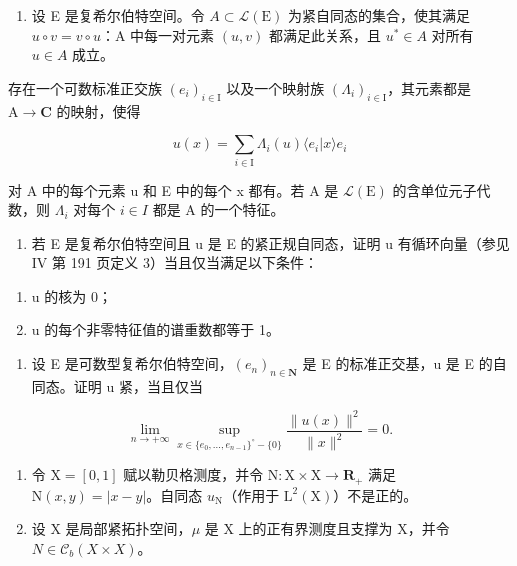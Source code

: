 \begin{enumerate}
\def\labelenumi{\arabic{enumi})}
\setcounter{enumi}{10}
\tightlist
\item
  设 E 是复希尔伯特空间。令 \(A \subset \mathcal{L}(\mathrm{E})\) 为紧自同态的集合，使其满足 \(u \circ v = v \circ u\)：A 中每一对元素 \((u, v)\) 都满足此关系，且 \(u^{*} \in A\) 对所有 \(u \in A\) 成立。
\end{enumerate}

存在一个可数标准正交族 \((e_i)_{i\in \mathrm{I}}\) 以及一个映射族 \((\Lambda_i)_{i\in \mathrm{I}}\)，其元素都是 \(\mathrm{A}\to \mathbf{C}\) 的映射，使得

\[
u (x) = \sum_ {i \in \mathrm{I}} \Lambda_ {i} (u) \langle e _ {i} | x \rangle e _ {i}
\]

对 A 中的每个元素 u 和 E 中的每个 x 都有。若 A 是 \(\mathcal{L}(\mathrm{E})\) 的含单位元子代数，则 \(\Lambda_{i}\) 对每个 \(i \in I\) 都是 A 的一个特征。

\begin{enumerate}
\def\labelenumi{\arabic{enumi})}
\setcounter{enumi}{11}
\tightlist
\item
  若 E 是复希尔伯特空间且 u 是 E 的紧正规自同态，证明 u 有循环向量（参见 IV 第 191 页定义 3）当且仅当满足以下条件：
\end{enumerate}

\begin{enumerate}
\def\labelenumi{(\roman{enumi})}
\item
  u 的核为 0；
\item
  u 的每个非零特征值的谱重数都等于 1。
\end{enumerate}

\begin{enumerate}
\def\labelenumi{\arabic{enumi})}
\setcounter{enumi}{12}
\tightlist
\item
  设 E 是可数型复希尔伯特空间，\((e_{n})_{n\in\mathbf{N}}\) 是 E 的标准正交基，u 是 E 的自同态。证明 u 紧，当且仅当
\end{enumerate}

\[
\lim _ {n \to + \infty} \sup _ {x \in \{e _ {0}, \dots , e _ {n - 1} \} ^ {\circ} - \{0 \}} \frac {\| u (x) \| ^ {2}}{\| x \| ^ {2}} = 0.
\]

\begin{enumerate}
\def\labelenumi{\arabic{enumi})}
\setcounter{enumi}{13}
\item
  令 \(\mathrm{X} = [0,1]\) 赋以勒贝格测度，并令 \(\mathrm{N}\colon \mathrm{X}\times \mathrm{X}\to \mathbf{R}_{+}\) 满足 \(\mathrm{N}(x,y) = |x - y|\)。自同态 \(u_{\mathrm{N}}\)（作用于 \(\mathrm{L}^2 (\mathrm{X})\)）不是正的。
\item
  设 X 是局部紧拓扑空间，\(\mu\) 是 X 上的正有界测度且支撑为 X，并令 \(N \in \mathcal{C}_{b}(X \times X)\)。
\end{enumerate}

